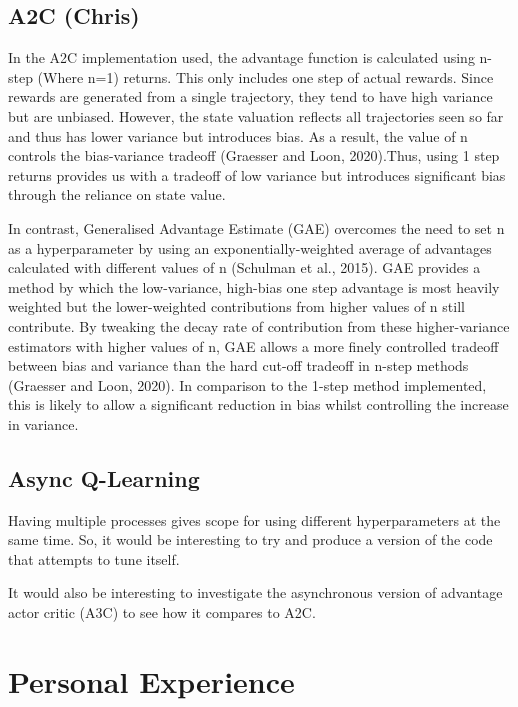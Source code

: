 \documentclass{article}
\begin{document}
\subsection{A2C (Chris)}

In the A2C implementation used, the advantage function is calculated using n-step (Where n=1) returns. This only includes one step of actual rewards. Since rewards are generated from a single trajectory, they tend to have high variance but are unbiased. However, the state valuation reflects all trajectories seen so far and thus has lower variance but introduces bias. As a result, the value of n controls the bias-variance tradeoff (Graesser and Loon, 2020).Thus, using 1 step returns provides us with a tradeoff of low variance but introduces significant bias through the reliance on state value.

In contrast, Generalised Advantage Estimate (GAE) overcomes the need to set n as a hyperparameter by using an exponentially-weighted average of advantages calculated with different values of n (Schulman et al., 2015). GAE provides a method by which the low-variance, high-bias one step advantage is most heavily weighted but the lower-weighted contributions from higher values of n still contribute. By tweaking the decay rate of contribution from these higher-variance estimators with higher values of n, GAE allows a more finely controlled tradeoff between bias and variance than the hard cut-off tradeoff in n-step methods (Graesser and Loon, 2020). In comparison to the 1-step method implemented, this is likely to allow a significant reduction in bias whilst controlling the increase in variance.

\subsection{Async Q-Learning}

Having multiple processes gives scope for using different hyperparameters at the same time. So, it would be interesting to try and produce a version of the code that attempts to tune itself.

It would also be interesting to investigate the asynchronous version of advantage actor critic (A3C) to see how it compares to A2C.

\section{Personal Experience}
\end{document}
